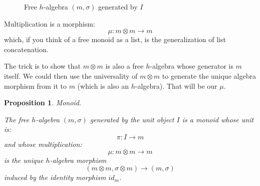 \documentclass[letterpaper, 10 pt, conference]{ieeeconf}
\newtheorem{proposition}{Proposition}[section]
\begin{document}
\begin{figure}[h]
\centering
{}
\caption{Free $h$-algebra $(m, \sigma)$ generated by $I$}
\label{fig-freei}
\end{figure}


Multiplication is a morphism:
\[\mu \colon m \otimes m \to m\]
which, if you think of a free monoid as a list, is the generalization of list concatenation. 

The trick is to show that $m \otimes m$ is also a free $h$-algebra whose generator is $m$ itself. We could then use the universality of $m \otimes m$ to generate the unique algebra morphism from it to $m$ (which is also an $h$-algebra). That will be our $\mu$.

\begin{proposition}{Monoid.}

The free $h$-algebra $(m, \sigma)$ generated by the unit object $I$ is a monoid whose unit is:
\[\pi \colon I \to m\] 
and whose multiplication:
\[\mu \colon m \otimes m \to m\] 
is the unique $h$-algebra morphism 
\[(m \otimes m, \sigma \otimes m) \to (m, \sigma)\] 
induced by the identity morphism $id_m$.
\end{proposition}
\end{document}
